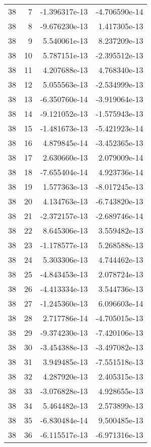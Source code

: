 \begin{tabular}{rrrr}
  38 &    7 & -1.396317e-13 & -4.706590e-14 \\
  38 &    8 & -9.676230e-13 &  1.417305e-13 \\
  38 &    9 &  5.540061e-13 &  8.237209e-13 \\
  38 &   10 &  5.787151e-13 & -2.395512e-13 \\
  38 &   11 &  4.207688e-13 &  4.768340e-13 \\
  38 &   12 &  5.055563e-13 & -2.534999e-13 \\
  38 &   13 & -6.350760e-14 & -3.919064e-13 \\
  38 &   14 & -9.121052e-13 & -1.575943e-13 \\
  38 &   15 & -1.481673e-13 & -5.421923e-14 \\
  38 &   16 &  4.879845e-14 & -3.452365e-13 \\
  38 &   17 &  2.630660e-13 &  2.079009e-14 \\
  38 &   18 & -7.655404e-14 &  4.923736e-14 \\
  38 &   19 &  1.577363e-13 & -8.017245e-13 \\
  38 &   20 &  4.134763e-13 & -6.743820e-13 \\
  38 &   21 & -2.372157e-13 & -2.689746e-14 \\
  38 &   22 &  8.645306e-13 &  3.559482e-13 \\
  38 &   23 & -1.178577e-13 &  5.268588e-13 \\
  38 &   24 &  5.303306e-13 &  4.744462e-13 \\
  38 &   25 & -4.843453e-13 &  2.078724e-13 \\
  38 &   26 & -4.413334e-13 &  3.544736e-13 \\
  38 &   27 & -1.245360e-13 &  6.096603e-14 \\
  38 &   28 &  2.717786e-14 & -4.705015e-13 \\
  38 &   29 & -9.374230e-13 & -7.420106e-13 \\
  38 &   30 & -3.454388e-13 & -3.497082e-13 \\
  38 &   31 &  3.949485e-13 & -7.551518e-13 \\
  38 &   32 &  4.287920e-13 &  2.405315e-13 \\
  38 &   33 & -3.076828e-13 &  4.928655e-13 \\
  38 &   34 &  5.464482e-13 &  2.573899e-13 \\
  38 &   35 & -6.830484e-14 &  9.500485e-13 \\
  38 &   36 & -6.115517e-13 & -6.971316e-13 \\

\end{tabular}
